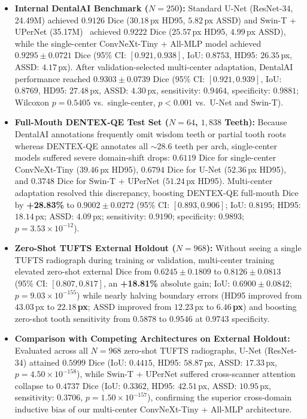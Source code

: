 \documentclass[review]{elsarticle}
\begin{document}
\begin{itemize}
    \item \textbf{Internal DentalAI Benchmark ($N=250$):} Standard U-Net (ResNet-34, 24.49M) achieved $0.9126$ Dice ($30.18$\,px HD95, $5.82$\,px ASSD) and Swin-T + UPerNet (35.17M)~\cite{liu2021swin, xiao2018unified} achieved $0.9222$ Dice ($25.57$\,px HD95, $4.99$\,px ASSD), while the single-center ConvNeXt-Tiny + All-MLP model achieved $0.9295 \pm 0.0721$ Dice (95\% CI: $[0.921, 0.938]$, IoU: $0.8753$, HD95: $26.35$\,px, ASSD: $4.17$\,px). After validation-selected multi-center adaptation, DentalAI performance reached $0.9303 \pm 0.0739$ Dice (95\% CI: $[0.921, 0.939]$, IoU: $0.8769$, HD95: $27.48$\,px, ASSD: $4.30$\,px, sensitivity: $0.9464$, specificity: $0.9881$; Wilcoxon $p = 0.5405$ vs.\ single-center, $p < 0.001$ vs.\ U-Net and Swin-T).
    \item \textbf{Full-Mouth DENTEX-QE Test Set ($N=64$, $1,838$ Teeth):} Because DentalAI annotations frequently omit wisdom teeth or partial tooth roots whereas DENTEX-QE annotates all $\sim$28.6 teeth per arch, single-center models suffered severe domain-shift drops: $0.6119$ Dice for single-center ConvNeXt-Tiny ($39.46$\,px HD95), $0.6794$ Dice for U-Net ($52.36$\,px HD95), and $0.3748$ Dice for Swin-T + UPerNet ($51.24$\,px HD95). Multi-center adaptation resolved this discrepancy, boosting DENTEX-QE full-mouth Dice by \textbf{+28.83\%} to \textbf{$0.9002 \pm 0.0272$} (95\% CI: $[0.893, 0.906]$; IoU: $0.8195$; HD95: $18.14$\,px; ASSD: $4.09$\,px; sensitivity: $0.9190$; specificity: $0.9893$; $p = 3.53 \times 10^{-12}$).
    \item \textbf{Zero-Shot TUFTS External Holdout ($N=968$):} Without seeing a single TUFTS radiograph during training or validation, multi-center training elevated zero-shot external Dice from $0.6245 \pm 0.1809$ to \textbf{$0.8126 \pm 0.0813$} (95\% CI: $[0.807, 0.817]$, an \textbf{+18.81\%} absolute gain; IoU: $0.6900 \pm 0.0842$; $p = 9.03 \times 10^{-155}$) while nearly halving boundary errors (HD95 improved from $43.03$\,px to \textbf{$22.18$\,px}; ASSD improved from $12.23$\,px to \textbf{$6.46$\,px}) and boosting zero-shot tooth sensitivity from $0.5878$ to \textbf{$0.9546$} at $0.9743$ specificity.
    \item \textbf{Comparison with Competing Architectures on External Holdout:} Evaluated across all $N=968$ zero-shot TUFTS radiographs, U-Net (ResNet-34) attained $0.5999$ Dice (IoU: $0.4415$, HD95: $58.87$\,px, ASSD: $17.33$\,px, $p = 4.50 \times 10^{-158}$), while Swin-T + UPerNet suffered cross-scanner attention collapse to $0.4737$ Dice (IoU: $0.3362$, HD95: $42.51$\,px, ASSD: $10.95$\,px, sensitivity: $0.3706$, $p = 1.50 \times 10^{-157}$), confirming the superior cross-domain inductive bias of our multi-center ConvNeXt-Tiny + All-MLP architecture.
\end{itemize}
\end{document}
